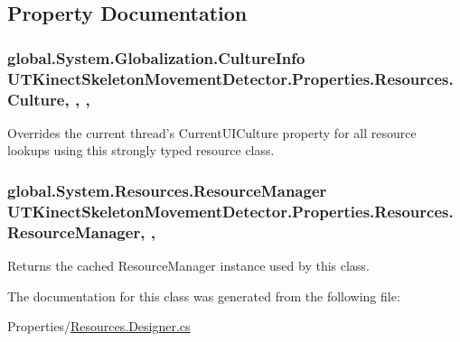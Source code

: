 \subsection{Property Documentation}
\hypertarget{classUTKinectSkeletonMovementDetector_1_1Properties_1_1Resources_a608c03f2809c649fadf649684bd8abb9}{
\subsubsection[{Culture}]{\setlength{\rightskip}{0pt plus 5cm}global.\-System.\-Globalization.\-Culture\-Info U\-T\-Kinect\-Skeleton\-Movement\-Detector.\-Properties.\-Resources.\-Culture\hspace{0.3cm}{\ttfamily [static]}, {\ttfamily [get]}, {\ttfamily [set]}, {\ttfamily [package]}}}\label{classUTKinectSkeletonMovementDetector_1_1Properties_1_1Resources_a608c03f2809c649fadf649684bd8abb9}


Overrides the current thread's Current\-U\-I\-Culture property for all resource lookups using this strongly typed resource class. 

\hypertarget{classUTKinectSkeletonMovementDetector_1_1Properties_1_1Resources_a3eef1a8dae6b38b004ce7f5d6b155ace}{
\subsubsection[{Resource\-Manager}]{\setlength{\rightskip}{0pt plus 5cm}global.\-System.\-Resources.\-Resource\-Manager U\-T\-Kinect\-Skeleton\-Movement\-Detector.\-Properties.\-Resources.\-Resource\-Manager\hspace{0.3cm}{\ttfamily [static]}, {\ttfamily [get]}, {\ttfamily [package]}}}\label{classUTKinectSkeletonMovementDetector_1_1Properties_1_1Resources_a3eef1a8dae6b38b004ce7f5d6b155ace}


Returns the cached Resource\-Manager instance used by this class. 



The documentation for this class was generated from the following file\-:\begin{DoxyCompactItemize}
\item 
Properties/\hyperlink{Resources_8Designer_8cs}{Resources.\-Designer.\-cs}\end{DoxyCompactItemize}
